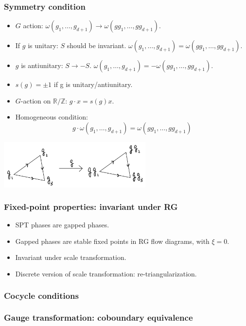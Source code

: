 \documentclass[xcolor=table, 12pt, aspectratio=43,ignorenonframetext]{beamer}
\begin{document}
\begin{frame}
\frametitle{Symmetry condition}

\begin{itemize}
\item $G$ action:
$\omega(g_1, \ldots, g_{d+1})\rightarrow \omega(gg_1, \ldots, gg_{d+1})$.
\item If $g$ is unitary: $S$ should be invariant. $\omega(g_1, \ldots, g_{d+1})= \omega(gg_1, \ldots, gg_{d+1})$.

\item $g$ is antiunitary: $S\rightarrow -S$. $\omega(g_1, \ldots, g_{d+1})= -\omega(gg_1, \ldots, gg_{d+1})$.
\item $s(g)=\pm1$ if g is unitary/antiunitary.
\item $G$-action on $\mathbb R/\mathbb Z$:
$g\cdot x=s(g)x$.
\item Homogeneous condition:
\[g\cdot\omega(g_1, \ldots, g_{d+1})= \omega(gg_1, \ldots, gg_{d+1})\]
\end{itemize}

\begin{center}
\includegraphics[height=2.5cm]{tri-action}
\end{center}
\end{frame}

\begin{frame}
\frametitle{Fixed-point properties: invariant under RG}
\begin{itemize}
\item SPT phases are gapped phases.
\item Gapped phases are stable fixed points in RG flow diagrams, with $\xi=0$.
\item Invariant under scale transformation.
\item Discrete version of scale transformation: re-triangularization.
\end{itemize}
\end{frame}

\begin{frame}
\frametitle{Cocycle conditions}
\end{frame}

\begin{frame}
\frametitle{Gauge transformation: coboundary equivalence}
\end{frame}
\end{document}
